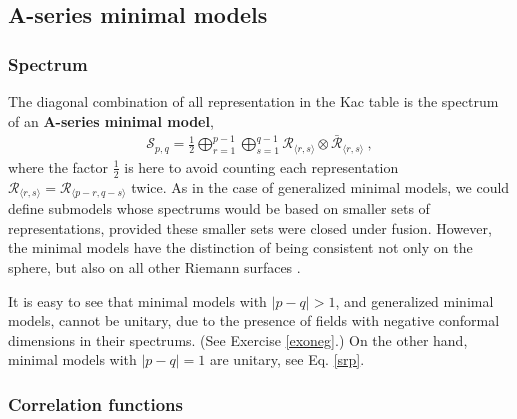 \documentclass[12pt, a4paper, notitlepage, twoside]{report}
\numberwithin{equation}{section}
\theoremstyle{break}
\begin{document}
\subsection{A-series minimal models \label{secamm}}

\subsubsection{Spectrum}

The diagonal combination of all representation in the Kac table is the spectrum of an \textbf{A-series minimal model},
\begin{align}
 \boxed{ \mathcal{S}_{p,q} = \frac12 \bigoplus_{r=1}^{p-1} \bigoplus_{s=1}^{q-1} \mathcal{R}_{\langle r,s \rangle}\otimes \bar{\mathcal{R}}_{\langle r,s \rangle} } \ ,
\label{smin}
\end{align}
where the factor $\frac12$ is here to avoid counting each representation $\mathcal{R}_{\langle r,s \rangle}=\mathcal{R}_{\langle p-r,q-s \rangle}$ twice.
As in the case of generalized minimal models, we could define submodels whose spectrums would be based on smaller sets of representations, provided these smaller sets were closed under fusion.
However, the minimal models have the distinction of being consistent not only on the sphere, but also on all other Riemann surfaces \cite{fms97}.

It is easy to see that minimal models with $|p-q|>1$, and generalized minimal models, cannot be unitary, due to the presence of fields with negative conformal dimensions in their spectrums. (See Exercise \ref{exoneg}.)
On the other hand, minimal models with $|p-q|=1$ are unitary, see Eq. \eqref{srp}.

\subsubsection{Correlation functions}
\end{document}
